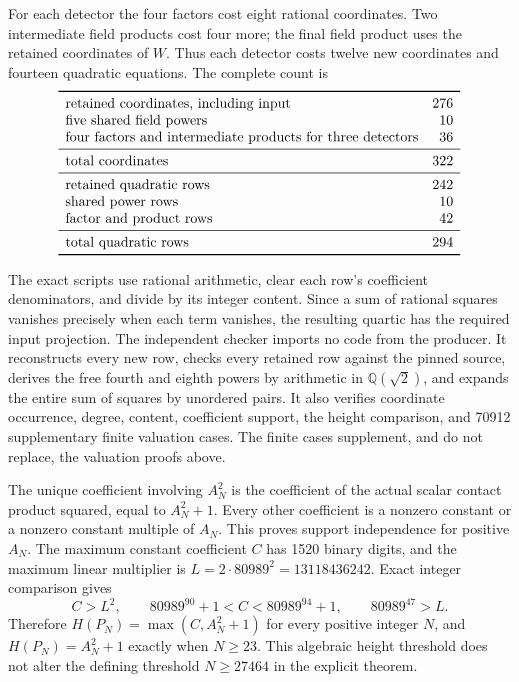 \documentclass[11pt,a4paper]{article}
\theoremstyle{remark}\newtheorem{remark}[theorem]{Remark}
\newcommand{\Q}{\mathbb Q}\newcommand{\Z}{\mathbb Z}\newcommand{\HH}{\mathcal H}
\begin{document}
For each detector the four factors cost eight rational coordinates.
Two intermediate field products cost four more; the final field
product uses the retained coordinates of $W$. Thus each detector
costs twelve new coordinates and fourteen quadratic equations.
The complete count is
\[
\begin{array}{lr}\toprule
\text{retained coordinates, including input}&276\\
\text{five shared field powers}&10\\
\text{four factors and intermediate products for three detectors}&36\\\midrule
\text{total coordinates}&322\\\midrule
\text{retained quadratic rows}&242\\
\text{shared power rows}&10\\
\text{factor and product rows}&42\\\midrule
\text{total quadratic rows}&294\\\bottomrule
\end{array}
\]

The exact scripts use rational arithmetic, clear each row's
coefficient denominators, and divide by its integer content. Since a
sum of rational squares vanishes precisely when each term vanishes,
the resulting quartic has the required input projection.
The independent checker imports no code from the producer. It
reconstructs every new row, checks every retained row against the
pinned source, derives the free fourth and eighth powers by arithmetic
in $\Q(\sqrt2)$, and expands the entire sum of squares by unordered
pairs. It also verifies coordinate occurrence, degree, content,
coefficient support, the height comparison, and 70912 supplementary
finite valuation cases. The finite cases supplement, and do not replace,
the valuation proofs above.

The unique coefficient involving $A_N^2$ is the coefficient of the
actual scalar contact product squared, equal to $A_N^2+1$.
Every other coefficient is a nonzero constant or a nonzero constant
multiple of $A_N$. This proves support independence for positive
$A_N$. The maximum constant coefficient $C$ has 1520 binary digits,
and the maximum linear multiplier is
$L=2\cdot80989^2=13118436242$. Exact integer comparison gives
\[
 C>L^2,\qquad 80989^{90}+1<C<80989^{94}+1,\qquad 80989^{47}>L.
\]
Therefore $H(P_N)=\max(C,A_N^2+1)$ for every positive integer $N$,
and $H(P_N)=A_N^2+1$ exactly when $N\ge23$.
This algebraic height threshold does not alter the defining threshold
$N\ge27464$ in the explicit theorem.
\end{document}
